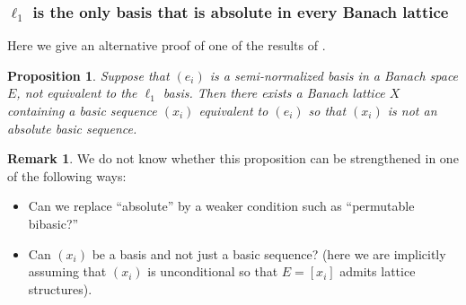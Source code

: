 \documentclass[12pt,leqno]{amsart}
\newtheorem{proposition}[theorem]{Proposition}
\numberwithin{equation}{section}
\theoremstyle{definition}
\newtheorem{remark}[theorem]{Remark}
\newcommand{\marg}[1]{\marginpar{\tiny #1}}     %
\newcommand{\timur}[1]{{\textcolor{blue}{{\bf T.O:} #1}}}
\begin{document}

\subsubsection{$\ell_1$ is the only basis that is  absolute in every Banach lattice}\label{ss:uncondiitonal bases}

Here we give an alternative proof of one of the results of \cite{OTTT}.

\begin{proposition}\label{p:destroy_arbitrary_uncinditional}
Suppose that $(e_i)$ is a semi-normalized  basis in a Banach space $E$, not equivalent to the $\ell_1$ basis.
Then there exists a Banach lattice $X$ containing a basic sequence $(x_i)$ equivalent to $(e_i)$ so that $(x_i)$ is not an absolute basic sequence.
\end{proposition}
\begin{remark}
 We do not know whether this proposition can be strengthened in one of the following ways:
 \begin{itemize}
  \item Can we replace ``absolute'' by a weaker condition such as ``permutable bibasic?''
  \item Can $(x_i)$ be a basis and not just a basic sequence? (here we are implicitly assuming that $(x_i)$ is unconditional  so that $E=[x_i]$ admits lattice structures).
 \end{itemize}
\end{remark}
\end{document}
